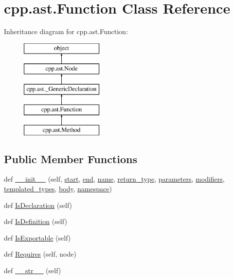 \hypertarget{classcpp_1_1ast_1_1_function}{}\section{cpp.\+ast.\+Function Class Reference}
\label{classcpp_1_1ast_1_1_function}
Inheritance diagram for cpp.\+ast.\+Function\+:\begin{figure}[H]
\begin{center}
\leavevmode
\includegraphics[height=5.000000cm]{d3/df5/classcpp_1_1ast_1_1_function}
\end{center}
\end{figure}
\subsection*{Public Member Functions}
\begin{DoxyCompactItemize}
\item 
def \mbox{\hyperlink{classcpp_1_1ast_1_1_function_ab5270f5d353ec5e9dcd136e4cc6c7f6c}{\+\_\+\+\_\+init\+\_\+\+\_\+}} (self, \mbox{\hyperlink{classcpp_1_1ast_1_1_node_a7b2aa97e6a049bb1a93aea48c48f1f44}{start}}, \mbox{\hyperlink{classcpp_1_1ast_1_1_node_a3c5e5246ccf619df28eca02e29d69647}{end}}, \mbox{\hyperlink{classcpp_1_1ast_1_1___generic_declaration_af774f4729dfd78d0538a6782fe8514c1}{name}}, \mbox{\hyperlink{classcpp_1_1ast_1_1_function_af750fd788d7ab33163ee066534780212}{return\+\_\+type}}, \mbox{\hyperlink{classcpp_1_1ast_1_1_function_a0e61ef47af9cf2fd4402dbd8cab631ef}{parameters}}, \mbox{\hyperlink{classcpp_1_1ast_1_1_function_ad30eed435f1ff9ff34ade9cc0d7be121}{modifiers}}, \mbox{\hyperlink{classcpp_1_1ast_1_1_function_a57bb03218bade3240137a0d91c467cb6}{templated\+\_\+types}}, \mbox{\hyperlink{classcpp_1_1ast_1_1_function_a8e25e5016b23b38e32acf2df529c0650}{body}}, \mbox{\hyperlink{classcpp_1_1ast_1_1___generic_declaration_a8aee3f11b37449d54b42a78e0a689f46}{namespace}})
\item 
def \mbox{\hyperlink{classcpp_1_1ast_1_1_function_ab9120d9a774eb5860d220b3bcdcaa87e}{Is\+Declaration}} (self)
\item 
def \mbox{\hyperlink{classcpp_1_1ast_1_1_function_ad5d96144bd8418ac72332bffb21ea86f}{Is\+Definition}} (self)
\item 
def \mbox{\hyperlink{classcpp_1_1ast_1_1_function_a85a073cd69116bc6191f379d69d10d72}{Is\+Exportable}} (self)
\item 
def \mbox{\hyperlink{classcpp_1_1ast_1_1_function_a999e7b5e43517cd4d68b1aeea8a7d6e1}{Requires}} (self, node)
\item 
def \mbox{\hyperlink{classcpp_1_1ast_1_1_function_aaef91d6a3b1eb2703eebb32d39c45978}{\+\_\+\+\_\+str\+\_\+\+\_\+}} (self)
\end{DoxyCompactItemize}
